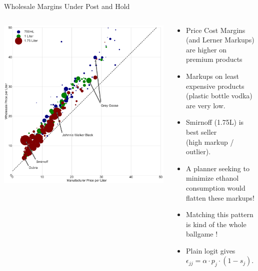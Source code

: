 \begin{frame}{Wholesale Margins Under Post and Hold}
\begin{columns}[T]
\begin{column}{.5\textwidth}
\begin{center}
\includegraphics[height=0.88\textheight]{../demand/resources/figure4_manuf_wholesale_price.pdf}
\end{center}
\end{column}
\hfill
\begin{column}{.5\textwidth}
  \begin{itemize}
  \item Price Cost Margins (and Lerner Markups) are higher on premium products
  \item Markups on least expensive products (plastic bottle vodka) are very low.
  \item Smirnoff (1.75L) is best seller\\ (high markup / outlier).
  \item A planner seeking to minimize ethanol consumption would flatten these markups!
  \item Matching this pattern is kind of the whole ballgame !
  \item Plain logit gives $\epsilon_{jj} = \alpha \cdot p_j  \cdot (1-s_j)$.
  \end{itemize}
  \end{column}
\end{columns}
\end{frame}



